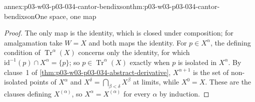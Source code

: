 \begin{annexitem}{annex:p03-w03-p03-034-cantor-bendixson}{thm:p03-w03-p03-034-cantor-bendixson}{One space, one map}
\begin{proof}
The only map is the identity, which is closed under composition; for
amalgamation take \(W=X\) and both maps the identity. For
\(p\in X^\alpha\), the defining condition of
\(\operatorname{Tr}^\alpha(X)\) concerns only the identity, for which
\(\mathrm{id}^{-1}(p)\cap X^\alpha=\{p\}\); so
\(p\in\operatorname{Tr}^\alpha(X)\) exactly when \(p\) is isolated in
\(X^\alpha\). By clause~1 of \cref{thm:p03-w03-p03-034-abstract-derivative},
\(X^{\alpha+1}\) is the set of non-isolated points of \(X^\alpha\) and
\(X^\delta=\bigcap_{\beta<\delta}X^\beta\) at limits, while \(X^0=X\).
These are the clauses defining \(X^{(\alpha)}\), so
\(X^\alpha=X^{(\alpha)}\) for every \(\alpha\) by induction.
\end{proof}
\end{annexitem}

